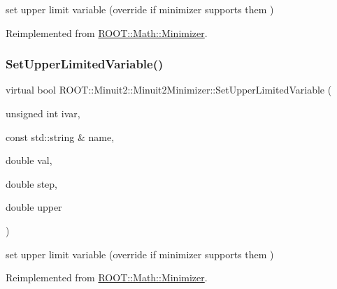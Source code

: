 set upper limit variable (override if minimizer supports them ) 



Reimplemented from \mbox{\hyperlink{classROOT_1_1Math_1_1Minimizer_a804843fbaea82809b3c54232d0c1fe86}{R\+O\+O\+T\+::\+Math\+::\+Minimizer}}.

\mbox{\label{classROOT_1_1Minuit2_1_1Minuit2Minimizer_a70209b37c419af5d8d1475ce8de29b43}} 
\subsubsection{\texorpdfstring{SetUpperLimitedVariable()}{SetUpperLimitedVariable()}\hspace{0.1cm}{\footnotesize\ttfamily [3/3]}}
{\footnotesize\ttfamily virtual bool R\+O\+O\+T\+::\+Minuit2\+::\+Minuit2\+Minimizer\+::\+Set\+Upper\+Limited\+Variable (\begin{DoxyParamCaption}\item[{unsigned int}]{ivar,  }\item[{const std\+::string \&}]{name,  }\item[{double}]{val,  }\item[{double}]{step,  }\item[{double}]{upper }\end{DoxyParamCaption})\hspace{0.3cm}{\ttfamily [virtual]}}



set upper limit variable (override if minimizer supports them ) 



Reimplemented from \mbox{\hyperlink{classROOT_1_1Math_1_1Minimizer_a804843fbaea82809b3c54232d0c1fe86}{R\+O\+O\+T\+::\+Math\+::\+Minimizer}}.

\mbox{\label{classROOT_1_1Minuit2_1_1Minuit2Minimizer_a951ad856f74ded3c64836fa28fdf9bb5}} 
